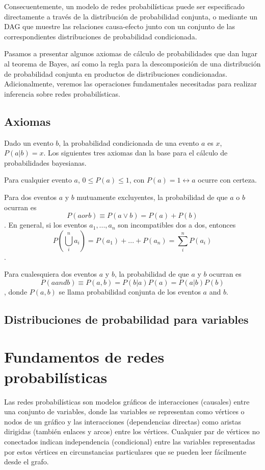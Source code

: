 Consecuentemente, un modelo de redes probabilísticas puede ser especificado directamente a través de la distribución 
de probabilidad conjunta, o mediante un DAG que muestre las relaciones causa-efecto junto con un conjunto de 
las correspondientes distribuciones de probabilidad condicionada.

Pasamos a presentar algunos axiomas de cálculo de probabilidades que dan lugar al teorema de Bayes, así como 
la regla para la descomposición de una distribución de probabilidad conjunta en productos de distribuciones 
condicionadas. Adicionalmente, veremos las operaciones fundamentales necesitadas para realizar inferencia 
sobre redes probabilísticas.

\subsection{Axiomas} 
Dado un evento $b$, la probabilidad condicionada de una evento $a$ es $x$, $P(a|b) = x$.
Los siguientes tres axiomas dan la base para el cálculo de probabilidades bayesianas.
\begin{axiom} 
Para cualquier evento $a$, $0 \leq P(a) \leq 1$, con $P(a)=1 \leftrightarrow a$ ocurre con certeza.
\end{axiom}

\begin{axiom}
Para dos eventos $a$ y $b$ mutuamente excluyentes, la probabilidad de que $a$ o $b$ ocurran es 
$$P(a or b) \equiv P(a \vee b)= P(a) + P(b)$$.
En general, si los eventos $a_{1},...,a_{n}$ son incompatibles dos a dos, entonces 
$$P(\bigcup_{i}^{n} a_{i})= P(a_{1}) + ... + P(a_{n}) = \sum_{i}^{n} P(a_{i})$$.
\end{axiom}

\begin{axiom}
Para cualesquiera dos eventos $a$ y $b$, la probabilidad de que $a$ y $b$ ocurran es 
$$P(a and b) \equiv P(a,b) = P(b|a)P(a) = P(a|b)P(b)$$, 
donde $P(a,b)$ se llama probabilidad conjunta de los eventos $a$ and $b$.
\end{axiom}

\subsection{Distribuciones de probabilidad para variables}



\section{Fundamentos de redes probabilísticas}
Las redes probabilísticas son modelos gráficos de interacciones (causales) entre una
conjunto de variables, donde las variables se representan como vértices o nodos de un 
gráfico y las interacciones (dependencias directas) como aristas dirigidas (también
enlaces y arcos) entre los vértices. Cualquier par de vértices no conectados indican 
independencia (condicional) entre las variables representadas
por estos vértices en circunstancias particulares que se pueden leer fácilmente desde el
grafo. 

